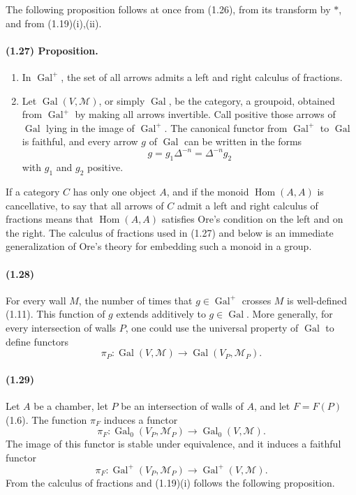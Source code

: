 \documentclass[10pt]{article}
\begin{document}
The following proposition follows at once from (1.26), from its transform by \(*\), and from (1.19)(i),(ii).

\paragraph{(1.27) Proposition.}
\begin{enumerate}[label=(\roman*)]
\item In \(\operatorname{Gal}^+\), the set of all arrows admits a left and right calculus of fractions.
\item Let \(\operatorname{Gal}(V,\mathcal M)\), or simply \(\operatorname{Gal}\), be the category, a groupoid, obtained from \(\operatorname{Gal}^+\) by making all arrows invertible. Call positive those arrows of \(\operatorname{Gal}\) lying in the image of \(\operatorname{Gal}^+\). The canonical functor from \(\operatorname{Gal}^+\) to \(\operatorname{Gal}\) is faithful, and every arrow \(g\) of \(\operatorname{Gal}\) can be written in the forms
\[
g=g_1\Delta^{-n}=\Delta^{-n}g_2
\]
with \(g_1\) and \(g_2\) positive.
\end{enumerate}

If a category \(C\) has only one object \(A\), and if the monoid \(\operatorname{Hom}(A,A)\) is cancellative, to say that all arrows of \(C\) admit a left and right calculus of fractions means that \(\operatorname{Hom}(A,A)\) satisfies Ore's condition on the left and on the right. The calculus of fractions used in (1.27) and below is an immediate generalization of Ore's theory for embedding such a monoid in a group.

\paragraph{(1.28)} For every wall \(M\), the number of times that \(g\in\operatorname{Gal}^+\) crosses \(M\) is well-defined (1.11). This function of \(g\) extends additively to \(g\in\operatorname{Gal}\). More generally, for every intersection of walls \(P\), one could use the universal property of \(\operatorname{Gal}\) to define functors
\[
\pi_P:\operatorname{Gal}(V,\mathcal M)\longrightarrow\operatorname{Gal}(V_P,\mathcal M_P).
\]

\paragraph{(1.29)} Let \(A\) be a chamber, let \(P\) be an intersection of walls of \(A\), and let \(F=F(P)\) (1.6). The function \(\pi_F\) induces a functor
\[
\tag{1.29.1}
\pi_F:\operatorname{Gal}_0(V_P,\mathcal M_P)\longrightarrow\operatorname{Gal}_0(V,\mathcal M).
\]
The image of this functor is stable under equivalence, and it induces a faithful functor
\[
\tag{1.29.2}
\pi_F:\operatorname{Gal}^+(V_P,\mathcal M_P)\longrightarrow\operatorname{Gal}^+(V,\mathcal M).
\]
From the calculus of fractions and (1.19)(i) follows the following proposition.
\end{document}

